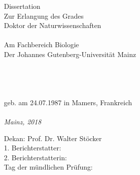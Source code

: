 %
\begin{titlepage}
	\centering
	\hfill
	\vfill
	{\LARGE\textbf{\thesisTitle} \par}
  ~\\
  ~\\
  ~\\
  ~\\
  ~\\
  Dissertation \\
  Zur Erlangung des Grades \\
  Doktor der Naturwissenschaften\\
  ~\\
  Am Fachbereich Biologie \\
  Der Johannes Gutenberg-Universität Mainz\\
	~\\
	~\\
	~\\
	{\Large\textbf{\thesisName}} \\
	geb. am 24.07.1987 in Mamers, Frankreich
	~\\
	~\\
	\vfill
	\textit{\large Mainz, 2018} \\
\end{titlepage}


\newpage
\thispagestyle{empty}
\mbox{}
\newpage

\hfill
\vfill
{
	\small
	Dekan: Prof. Dr. Walter Stöcker \\
	1. Berichterstatter: \thesisFirstReviewer \\
	2. Berichterstatterin: \thesisSecondReviewer \\
	Tag der mündlichen Prüfung: \\
}


